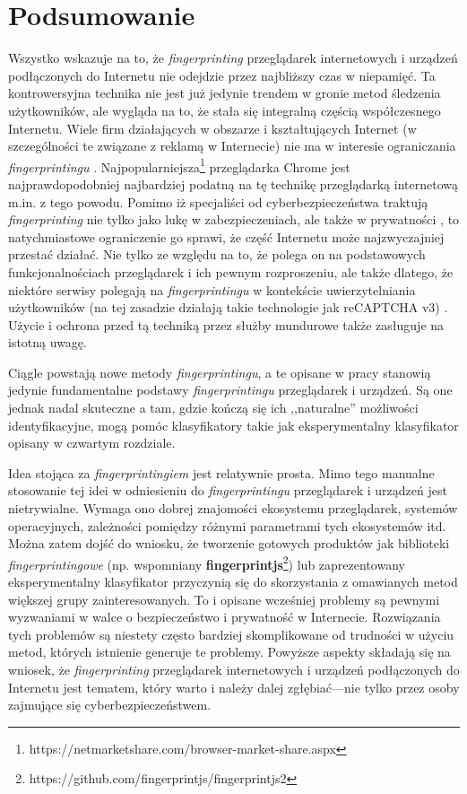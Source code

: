 \chapter{Podsumowanie}
Wszystko wskazuje na to, że \emph{fingerprinting} przeglądarek internetowych i
urządzeń podłączonych do Internetu nie odejdzie przez najbliższy czas w
niepamięć. Ta kontrowersyjna technika nie jest już jedynie trendem w gronie
metod śledzenia użytkowników, ale wygląda na to, że stała się integralną częścią
współczesnego Internetu. Wiele firm działających w obszarze i kształtujących
Internet (w szczególności te związane z reklamą w Internecie) nie ma w interesie
ograniczania \emph{fingerprintingu} \cite{al2018beyond}.
Najpopularniejsza\footnote{https://netmarketshare.com/browser-market-share.aspx}
przeglądarka Chrome jest najprawdopodobniej najbardziej podatną \cite{al2017not}
na tę technikę przeglądarką internetową m.in. z tego powodu. Pomimo iż
specjaliści od cyberbezpieczeństwa traktują \emph{fingerprinting} nie tylko jako
lukę w zabezpieczeniach, ale także w prywatności
\cite{mowery2012pixel,al2020too}, to natychmiastowe ograniczenie go sprawi, że
część Internetu może najzwyczajniej przestać działać. Nie tylko ze względu na
to, że polega on na podstawowych funkcjonalnościach przeglądarek i ich pewnym
rozproszeniu, ale także dlatego, że niektóre serwisy polegają na
\emph{fingerprintingu} w kontekście uwierzytelniania użytkowników (na tej
zasadzie działają takie technologie jak reCAPTCHA v3) \cite{45581}. Użycie i
ochrona przed tą techniką przez służby mundurowe także zasługuje na istotną
uwagę.

Ciągle powstają nowe metody \emph{fingerprintingu}, a te opisane w pracy
stanowią jedynie fundamentalne podstawy \emph{fingerprintingu} przeglądarek i
urządzeń. Są one jednak nadal skuteczne a tam, gdzie kończą się ich
,,naturalne'' możliwości identyfikacyjne, mogą pomóc klasyfikatory takie jak
eksperymentalny klasyfikator opisany w czwartym rozdziale.

Idea stojąca za \emph{fingerprintingiem} jest relatywnie prosta. Mimo tego
manualne stosowanie tej idei w odniesieniu do \emph{fingerprintingu}
przeglądarek i urządzeń jest nietrywialne. Wymaga ono dobrej znajomości
ekosystemu przeglądarek, systemów operacyjnych, zależności pomiędzy różnymi
parametrami tych ekosystemów itd. Można zatem dojść do wniosku, że tworzenie
gotowych produktów jak biblioteki \emph{fingerprintingowe} (np. wspomniany
\textbf{fingerprintjs}\footnote{https://github.com/fingerprintjs/fingerprintjs2})
lub zaprezentowany eksperymentalny klasyfikator przyczynią się do skorzystania z
omawianych metod większej grupy zainteresowanych. To i opisane wcześniej
problemy są pewnymi wyzwaniami w walce o bezpieczeństwo i prywatność w
Internecie. Rozwiązania tych problemów są niestety często bardziej skomplikowane
od trudności w użyciu metod, których istnienie generuje te problemy. Powyższe
aspekty składają się na wniosek, że \emph{fingerprinting} przeglądarek
internetowych i urządzeń podłączonych do Internetu jest tematem, który warto i
należy dalej zgłębiać---nie tylko przez osoby zajmujące się
cyberbezpieczeństwem.
